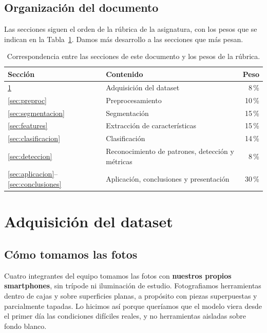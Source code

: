\documentclass[11pt,a4paper]{article}
\begin{document}
\subsection{Organización del documento}

Las secciones siguen el orden de la rúbrica de la asignatura, con los pesos que se indican en la
Tabla~\ref{tab:pesos}. Damos más desarrollo a las secciones que más pesan.

\begin{table}[htbp]
\centering
\caption{Correspondencia entre las secciones de este documento y los pesos de la rúbrica.}
\label{tab:pesos}
\small
\begin{tabular}{@{}llr@{}}
\toprule
\textbf{Sección} & \textbf{Contenido} & \textbf{Peso} \\
\midrule
\ref{sec:dataset} & Adquisición del dataset            & 8\,\% \\
\ref{sec:preproc} & Preprocesamiento                    & 10\,\% \\
\ref{sec:segmentacion} & Segmentación                   & 15\,\% \\
\ref{sec:features} & Extracción de características      & 15\,\% \\
\ref{sec:clasificacion} & Clasificación                 & 14\,\% \\
\ref{sec:deteccion} & Reconocimiento de patrones, detección y métricas & 8\,\% \\
\ref{sec:aplicacion}--\ref{sec:conclusiones} & Aplicación, conclusiones y presentación & 30\,\% \\
\bottomrule
\end{tabular}
\end{table}

\section{Adquisición del dataset}
\label{sec:dataset}

\subsection{Cómo tomamos las fotos}

Cuatro integrantes del equipo tomamos las fotos con \textbf{nuestros propios smartphones}, sin
trípode ni iluminación de estudio. Fotografiamos herramientas dentro de cajas y sobre superficies
planas, a propósito con piezas superpuestas y parcialmente tapadas. Lo hicimos así porque
queríamos que el modelo viera desde el primer día las condiciones difíciles reales, y no
herramientas aisladas sobre fondo blanco.
\end{document}
